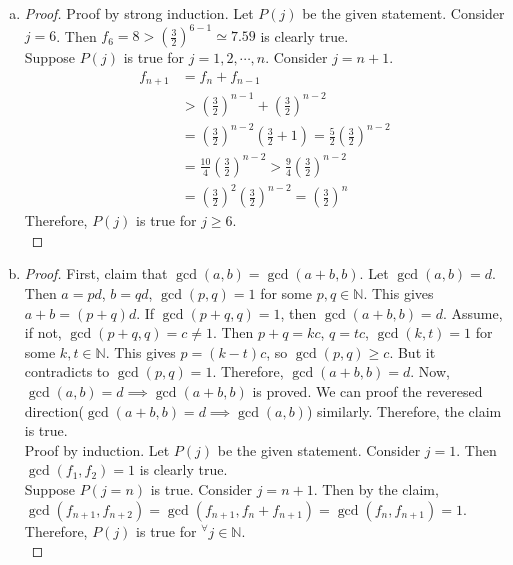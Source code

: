 \begin{enumerate} [(a)]
\begin{proof}
			Suppose $P(j = n)$ is true. Consider $j = n + 1$.
			\begin{align*}
				f_{n + 1}^2 &= f_{n + 1}(f_n + f_{n - 1})\\
				&= f_{n + 1}f_n + f_{n + 1}f_{n - 1}\\
				&= f_{n + 1}f_n + \left(f_n^2 - (-1)^{n + 1}\right)\\
				&= f_n(f_{n + 1} + f_{n}) + (-1)^{n + 2}\\
				&= f_nf_{n + 2} + (-1)^{n + 2}
			\end{align*}
			Therefore, $P(j)$ is true for $j \geq 2$.\\
		\end{proof}
		\item 
		\begin{proof}
			Proof by strong induction. Let $P(j)$ be the given statement. Consider $j = 6$. Then $f_6 = 8 > \left(\frac{3}{2}\right)^{6 - 1} \simeq 7.59$ is clearly true.\\
			Suppose $P(j)$ is true for $j = 1, 2, \cdots, n$. Consider $j = n + 1$.
			\begin{align*}
				f_{n + 1} &= f_n + f_{n - 1}\\
				&> \left(\frac{3}{2}\right)^{n - 1} + \left(\frac{3}{2}\right)^{n - 2}\\
				&= \left(\frac{3}{2}\right)^{n - 2}\left(\frac{3}{2} + 1\right)
				= \frac{5}{2}\left(\frac{3}{2}\right)^{n - 2}\\
				&= \frac{10}{4}\left(\frac{3}{2}\right)^{n - 2} > \frac{9}{4}\left(\frac{3}{2}\right)^{n - 2}\\
				&= \left(\frac{3}{2}\right)^2\left(\frac{3}{2}\right)^{n - 2} = \left(\frac{3}{2}\right)^n
			\end{align*}
			Therefore, $P(j)$ is true for $j \geq 6$.\\
		\end{proof}
		\item 
		\begin{proof}
			First, claim that $\gcd(a, b) = \gcd(a + b, b).$ Let $\gcd(a, b) = d$. Then $a = pd$, $b = qd$, $\gcd(p, q) = 1$ for some $p, q \in \mathbb{N}$. This gives $a + b = (p + q)d$. If $\gcd(p + q, q) = 1$, then $\gcd(a + b, b) = d$. Assume, if not, $\gcd(p + q, q) = c \neq 1$. Then $p + q = kc$, $q = tc$, $\gcd(k, t) = 1$ for some $k, t \in \mathbb{N}$. This gives $p = (k - t)c$, so $\gcd(p, q) \geq c$. But it contradicts to $\gcd(p, q) = 1$. Therefore, $\gcd(a + b, b) = d$. Now, $\gcd(a, b) = d \implies \gcd(a + b, b)$ is proved. We can proof the reveresed direction($\gcd(a + b, b) = d \implies \gcd(a, b)$) similarly. Therefore, the claim is true.\\
			Proof by induction. Let $P(j)$ be the given statement. Consider $j = 1$. Then $\gcd(f_1, f_2) = 1$ is clearly true.\\
			Suppose $P(j = n)$ is true. Consider $j = n + 1$. Then by the claim, $\gcd(f_{n + 1}, f_{n + 2}) = \gcd(f_{n + 1}, f_{n} + f_{n + 1}) = \gcd(f_{n}, f_{n + 1}) = 1$. Therefore, $P(j)$ is true for $^\forall j\in\mathbb{N}$.\\
		\end{proof}
	\end{enumerate}